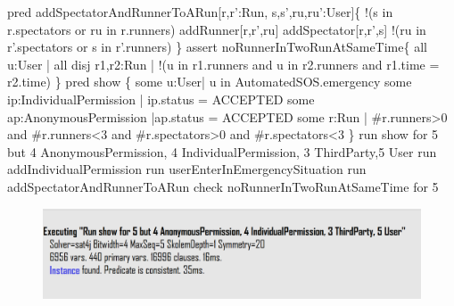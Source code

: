 \documentclass[a4paper]{article}
\begin{document}
{\newline pred addSpectatorAndRunnerToARun[r,r':Run, s,s',ru,ru':User]\{
\newline 	!(s in r.spectators or ru in r.runners)
\newline 	addRunner[r,r',ru]
\newline 	addSpectator[r,r',s]
\newline 
\newline 	!(ru in r'.spectators or s in r'.runners)
\newline \}
\newline 
\newline assert noRunnerInTwoRunAtSameTime\{
\newline 	all u:User | all disj r1,r2:Run | !(u in r1.runners  and u in r2.runners and r1.time = r2.time)
\newline \}
\newline 
\newline 
\newline pred show \{
\newline 	some u:User| u in AutomatedSOS.emergency 
\newline 	some ip:IndividualPermission | ip.status = ACCEPTED 
\newline 	some ap:AnonymousPermission |ap.status = ACCEPTED
\newline 	some r:Run | \#r.runners>0 and \#r.runners<3 and \#r.spectators>0 and \#r.spectators<3
\newline \}
\newline 
\newline run show for 5 but 4 AnonymousPermission, 4 \newline IndividualPermission, 3 ThirdParty,5 User
\newline run addIndividualPermission
\newline run  userEnterInEmergencySituation
\newline run addSpectatorAndRunnerToARun
\newline check noRunnerInTwoRunAtSameTime for 5}


\begin{figure}[H]
    \centering
    \includegraphics[width=\textwidth]{alloyResult1}
\end{figure}
\end{document}
